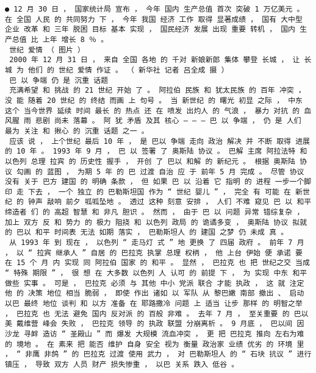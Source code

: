 \documentclass{article}
\begin{document}
\begin{Verbatim}[commandchars=\\\{\}]
 ● 12 月 30 日 ， 国家统计局 宣布 ， 今年 国内 生产总值 首次 突破 1 万亿美元 。 在 全国 人民 的 共同努力 下 ， 今年 我国 经济 工作 取得 显著成绩 ， 国有 大中型 企业 改革 和 三年 脱困 目标 基本 实现 ， 国民经济 发展 出现 重要 转机 ， 国内 生产总值 比 上年 增长 8 ％ 。 
 世纪 爱情 （ 图片 ） 
 2000 年 12 月 31 日 ， 来自 全国 各地 的 千对 新娘新郎 集体 攀登 长城 ， 让 长城 为 他们 的 世纪 爱情 作证 。 （ 新华社 记者 吕全成 摄 ） 
 巴 以 争端 仍 是 沉重 话题 
 充满希望 和 挑战 的 21 世纪 开始 了 。 阿拉伯 民族 和 犹太民族 的 百年 冲突 ， 没 能 随着 20 世纪 的 终结 而画 上 句号 。 当 新世纪 的 曙光 初显 之际 ， 中东 这个 当今世界 延续 时间 最长 的 热点 还 在 喷发 出灼人 的 气浪 ， 暴力 对抗 的 血风腥 雨 悲剧 尚未 落幕 。 阿 犹 矛盾 及其 核心 — — — 巴 以 争端 ， 仍 是 人们 最为 关注 和 揪心 的 沉重 话题 之一 。 
 应该 说 ， 上个世纪 最后 10 年 ， 是 巴以 争端 走向 政治 解决 并 不断 取得 进展 的 10 年 。 1993 年 9 月 ， 巴 以 签署 了 奥斯陆 协议 。 巴解 主席 阿拉法特 和 以色列 总理 拉宾 的 历史性 握手 ， 开创 了 巴以 和解 的 新纪元 。 根据 奥斯陆 协议 勾画 的 蓝图 ， 为期 5 年 的 巴 过渡 自治 应 于 前年 5 月 完成 。 尽管 协议 没有 关于 巴方 建国 的 明确 条款 ， 但 如果 巴 以 沿着 它 指明 的 进程 一步一个脚印 走 下去 ， 一个 独立 的 巴勒斯坦国 作为 “ 世纪 婴儿 ” ， 完全 有 可能 在 新世纪 的 钟声 敲响 前夕 呱呱坠地 。 透过 这种 刻意 安排 ， 人们 不难 窥见 巴 以 和平 缔造者 们 的 高超 智慧 和 非凡 胆识 。 然而 ， 由于 巴 以 问题 异常 错综复杂 ， 加上 双方 反 和 势力 的 极力 阻挠 和 以色列 政局 的 诡谲多变 ， 奥斯陆 协议 拟就 的 巴以 和平 时间表 无法 如期 落实 ， 巴勒斯坦人 的 建国 之梦 仍 未成 真 。 
 从 1993 年 到 现在 ， 以色列 “ 走马灯 式 ” 地 更换 了 四届 政府 。 前年 7 月 ， 以 “ 拉宾 继承人 ” 自居 的 巴拉克 执掌 总理 权柄 ， 他 上台 伊始 便 承诺 要 在 15 个 月 内 实现 同 阿拉伯 国家 的 和平 。 显然 ， 巴拉克 也 把 世纪之交 当成 “ 特殊 期限 ” ， 很 想 在 大多数 以色列 人 认可 的 前提 下 ， 为 实现 中东 和平 做些 实事 。 可是 ， 巴拉克 必须 与 其他 中小 党派 联合 才能 执政 ， 这 就 注定 他 的 决策 地位 相当 脆弱 ， 即使 作出 诸如 以 军队 从 黎巴嫩 南部 撤出 、 启动 以巴 最终 地位 谈判 和 以方 准备 在 耶路撒冷 问题 上 适当 让步 那样 的 明智之举 ， 巴拉克 也 无法 避免 国内 反对派 的 百般 非难 。 去年 7 月 ， 至关重要 的 巴以 美 戴维营 峰会 失败 ， 巴拉克 领导 的 执政 联盟 分崩离析 。 9 月底 ， 巴以间 因 沙龙 寻衅 造访 “ 圣殿山 ” 而 爆发 大规模 流血冲突 ， 更 把 巴拉克 推向 左右为难 的 境地 。 在 素来 把 能否 维护 自身 安全 视为 衡量 政治家 业绩 优劣 的 环境 里 ， “ 非鹰 非鸽 ” 的 巴拉克 过渡 使用 武力 ， 对 巴勒斯坦人 的 “ 石块 抗议 ” 进行 镇压 ， 导致 双方 人员 财产 损失惨重 ， 以巴 关系 跌入 低谷 。 

\end{Verbatim}
\end{document}
